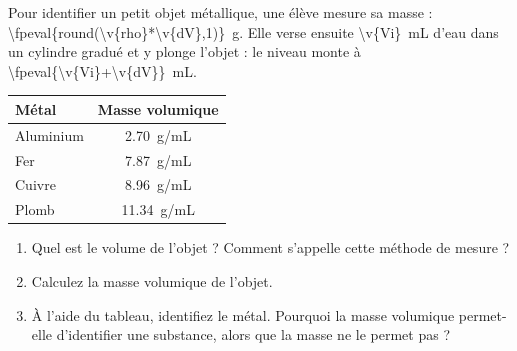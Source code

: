 Pour identifier un petit objet métallique, une élève mesure sa masse : \qty{\fpeval{round(\v{rho}*\v{dV},1)}}{g}. Elle verse ensuite \qty{\v{Vi}}{mL} d'eau dans un cylindre gradué et y plonge l'objet : le niveau monte à \qty{\fpeval{\v{Vi}+\v{dV}}}{mL}.

\begin{center}
\begin{tabular}{lc}
    \hline
    Métal & Masse volumique \\
    \hline
    Aluminium & \qty{2.70}{g/mL} \\
    Fer & \qty{7.87}{g/mL} \\
    Cuivre & \qty{8.96}{g/mL} \\
    Plomb & \qty{11.34}{g/mL} \\
    \hline
\end{tabular}
\end{center}

\begin{enumerate}[label=\alph*)]
    \item Quel est le volume de l'objet ? Comment s'appelle cette méthode de mesure ?
    \item Calculez la masse volumique de l'objet.
    \item À l'aide du tableau, identifiez le métal. Pourquoi la masse volumique permet-elle d'identifier une substance, alors que la masse ne le permet pas ?
\end{enumerate}
